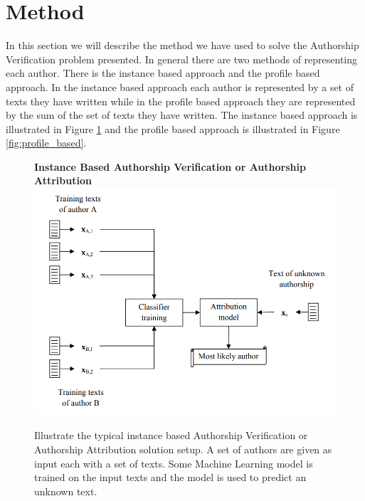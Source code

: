 \section{Method} \label{sec:method} 

In this section we will describe the method we have used to solve the Authorship
Verification problem presented. In general there are two methods of representing
each author. There is the instance based approach and the profile based
approach. In the instance based approach each author is represented by a set of
texts they have written while in the profile based approach they are represented
by the sum of the set of texts they have written. The instance based approach is
illustrated in Figure \ref{fig:instance_based} and the profile based approach is
illustrated in Figure \ref{fig:profile_based}.

\begin{figure}[htb]
    \centering
    \textbf{Instance Based Authorship Verification or Authorship Attribution}
    \includegraphics[scale=0.4]{./pictures/method/instance_based.png}

    \caption{Illustrate the typical instance based Authorship Verification or
        Authorship Attribution solution setup.\cite{stamatos2009} A set of
        authors are given as input each with a set of texts. Some Machine
        Learning model is trained on the input texts and the model is used to
        predict an unknown text. }

    \label{fig:instance_based}
\end{figure}

